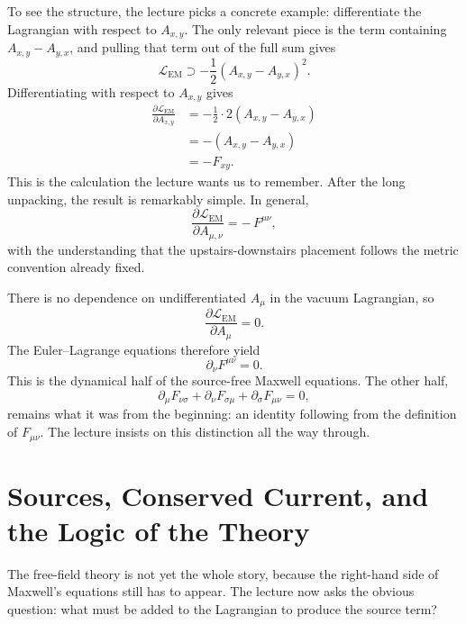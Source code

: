 To see the structure, the lecture picks a concrete example: differentiate the Lagrangian with respect to \(A_{x,y}\). The only relevant piece is the term containing \(A_{x,y}-A_{y,x}\), and pulling that term out of the full sum gives
\begin{equation}
\mathcal L_{\mathrm{EM}}
\supset
-\frac12\left(A_{x,y}-A_{y,x}\right)^2.
\end{equation}
Differentiating with respect to \(A_{x,y}\) gives
\begin{align}
\frac{\partial\mathcal L_{\mathrm{EM}}}{\partial A_{x,y}}
&=
-\frac12\cdot 2\left(A_{x,y}-A_{y,x}\right)
\\
&=
-\left(A_{x,y}-A_{y,x}\right)
\\
&=
-F_{xy}.
\end{align}
This is the calculation the lecture wants us to remember. After the long unpacking, the result is remarkably simple. In general,
\begin{equation}
\frac{\partial\mathcal L_{\mathrm{EM}}}{\partial A_{\mu,\nu}}
=
-\,F^{\mu\nu},
\end{equation}
with the understanding that the upstairs-downstairs placement follows the metric convention already fixed.

There is no dependence on undifferentiated \(A_\mu\) in the vacuum Lagrangian, so
\begin{equation}
\frac{\partial\mathcal L_{\mathrm{EM}}}{\partial A_\mu}=0.
\end{equation}
The Euler--Lagrange equations therefore yield
\begin{equation}
\partial_\nu F^{\mu\nu}=0.
\end{equation}
This is the dynamical half of the source-free Maxwell equations. The other half,
\begin{equation}
\partial_\mu F_{\nu\sigma}
+\partial_\nu F_{\sigma\mu}
+\partial_\sigma F_{\mu\nu}=0,
\end{equation}
remains what it was from the beginning: an identity following from the definition of \(F_{\mu\nu}\). The lecture insists on this distinction all the way through.

\section{Sources, Conserved Current, and the Logic of the Theory}

The free-field theory is not yet the whole story, because the right-hand side of Maxwell's equations still has to appear. The lecture now asks the obvious question: what must be added to the Lagrangian to produce the source term?

